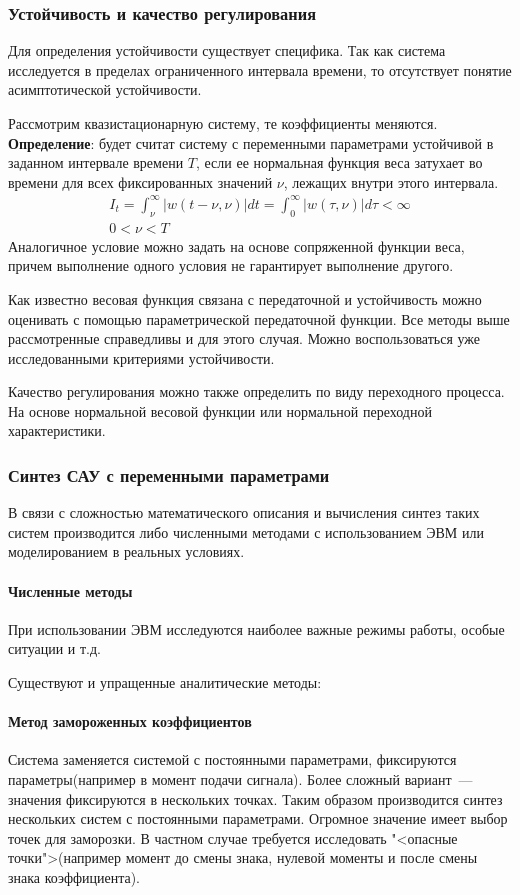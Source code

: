 \subsubsection{Устойчивость и качество регулирования}
Для определения устойчивости существует специфика. Так как система исследуется в пределах ограниченного интервала времени, то отсутствует понятие асимптотической устойчивости.

Рассмотрим квазистационарную систему, те коэффициенты меняются. \textbf{Определение}: будет считат систему с переменными параметрами устойчивой в заданном интервале времени $T$, если ее нормальная функция веса затухает во времени для всех фиксированных значений $\nu$, лежащих внутри этого интервала.
\begin{align*}
	I_t=\int^{\infty}_{\nu}|w(t-\nu,\nu)|dt=\int^{\infty}_0|w(\tau,\nu)|d\tau<\infty \\
	0<\nu<T
\end{align*}
Аналогичное условие можно задать на основе сопряженной функции веса, причем выполнение одного условия не гарантирует выполнение другого.

Как известно весовая функция связана с передаточной и устойчивость можно оценивать с помощью параметрической передаточной функции. Все методы выше рассмотренные справедливы и для этого случая. Можно воспользоваться уже исследованными критериями устойчивости.

Качество регулирования можно также определить по виду переходного процесса. На основе нормальной весовой функции или нормальной переходной характеристики.

\subsubsection{Синтез САУ с переменными параметрами}
В связи с сложностью математического описания и вычисления синтез таких систем производится либо численными методами с использованием ЭВМ или моделированием в реальных условиях.

\paragraph{Численные методы} При использовании ЭВМ исследуются наиболее важные режимы работы, особые ситуации и т.д. 

Существуют и упращенные аналитические методы:

\paragraph{Метод замороженных коэффициентов}
Система заменяется системой с постоянными параметрами, фиксируются параметры(например в момент подачи сигнала). Более сложный вариант~--- значения фиксируются в нескольких точках. Таким образом производится синтез нескольких систем с постоянными параметрами. Огромное значение имеет выбор точек для заморозки. В частном случае требуется исследовать "<опасные точки">(например момент до смены знака, нулевой моменты и после смены знака коэффициента).

